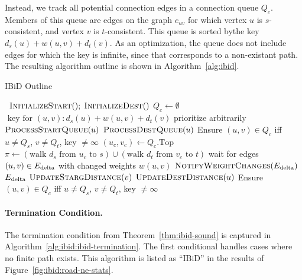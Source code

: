 Instead,
we track all potential connection edges in a connection queue $Q_c$.
Members of this queue are edges on the graph $e_{uv}$
for which vertex $u$ is $s$-consistent,
and vertex $v$ is $t$-consistent.
This queue is sorted bythe key $d_s(u) + w(u,v) + d_t(v)$.
As an optimization,
the queue does not include edges for which the key is infinite,
since that corresponds to a non-existant path.
The resulting algorithm outline is shown in Algorithm~\ref{alg:ibid}.

\begin{algorithm}[t]
   \caption{IBiD Outline}
   \label{alg:ibid}
   \begin{algorithmic}[1]
       {\,}
         \State $\mbox{\sc InitializeStart}(); \; \mbox{\sc InitializeDest}()$
         \State $Q_c \gets \emptyset$
            \Comment $\mbox{ key for } (u,v): d_s(u) + w(u,v) + d_t(v)$
         \Loop
                     \Comment prioritize arbitrarily
                  \State $\mbox{\sc ProcessStartQueue}(u)$
               \Else
                  \State $\mbox{\sc ProcessDestQueue}(u)$
               \EndIf
               \State Ensure $(u,v) \in Q_c$ iff
                  $u \neq Q_s$, $v \neq Q_t$, key $\neq \infty$
            \EndWhile
            \State $(u_c,v_c) \gets Q_c.\mbox{Top}$
            \State $\pi \gets
               ( \mbox{walk } d_s \mbox{ from } u_c \mbox{ to } s )
               \cup
               ( \mbox{walk } d_t \mbox{ from } v_c \mbox{ to } t )$
            \State wait for edges $(u,v) \in E_{\mbox{\scriptsize delta}}$ with changed weights $w(u,v)$
            \State $\mbox{\sc NotifyWeightChanges}(E_{\mbox{\scriptsize delta}})$
         \EndLoop
      \EndProcedure
       {$E_{\mbox{\scriptsize delta}}$}
            \State $\mbox{\sc UpdateStargDistance}(v)$
            \State $\mbox{\sc UpdateDestDistance}(u)$
         \EndFor
         \State Ensure $(u,v) \in Q_c$ iff
            $u \neq Q_s$, $v \neq Q_t$, key $\neq \infty$
      \EndProcedure
   \end{algorithmic}
\end{algorithm}

\paragraph{Termination Condition.}
The termination condition from Theorem~\ref{thm:ibid-sound}
is captured in Algorithm~\ref{alg:ibid:ibid-termination}.
The first conditional handles cases where no finite path exists.
This algorithm is listed as ``IBiD''
in the results of Figure~\ref{fig:ibid:road-ne-stats}.

